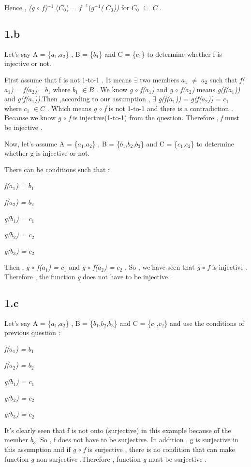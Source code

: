 \documentclass[12pt]{article}
\begin{document}
Hence , \textit{(g $\circ$ f)$^{-1}$} (\textit{$C_0$}) = \textit{$f^{-1}$}(\textit{$g^{-1}$(} \textit{$C_0$))} for \textit{$C_0$} $\subseteq$ \textit{$C$} .\\
\subsection*{1.b}
\hspace{15px} Let's say A = \{$a_1$,$a_2$\} , B = \{$b_1$\} and C = \{$c_1$\} to determine whether f is injective or not.\par
First assume that f is not 1-to-1 . It means $\exists$ two members $a_1$ $\neq$ $a_2$ such that \textit{f($a_1$) = f($a_2$)= $b_1$} where $b_1$ $\in{B}$ . We know \textit{g $\circ$ f($a_1$)} and \textit{g $\circ$ f($a_2$)} means \textit{g(f($a_1$))} and \textit{g(f($a_1$))}.Then ,according to our assumption , $\exists$ \textit{g(f($a_1$))} = \textit{g(f($a_2$))} = $c_1$ where $c_1$ $\in{C}$ . Which means \textit{g $\circ$ f} is not 1-to-1 and there is a contradiction . Because we know \textit{g $\circ$ f} is injective(1-to-1) from the question. Therefore , \textit{f} must be injective . \par 
Now, let's assume A = \{$a_1$,$a_2$\} , B = \{$b_1$,$b_2$,$b_3$\} and C = \{$c_1$,$c_2$\} to determine whether g is injective or not.\par
There can be conditions such that : \par
\textit{f($a_1$) = $b_1$} \par 
\textit{f($a_2$) = $b_2$} \par
\textit{g($b_1$) = $c_1$} \par 
\textit{g($b_2$) = $c_2$} \par
\textit{g($b_3$) = $c_2$} \par 
Then , \textit{g $\circ$ f($a_1$) = $c_1$} and \textit{g $\circ$ f($a_2$) = $c_2$} . So , we'have seen that \textit{g $\circ$ f} is injective . Therefore , the function \textit{g} does not have to be injective .

\subsection*{1.c}
\hspace{15px} Let's say A = \{$a_1$,$a_2$\} , B = \{$b_1$,$b_2$,$b_3$\} and C = \{$c_1$,$c_2$\} and use the conditions of previous question :\par
\textit{f($a_1$) = $b_1$} \par 
\textit{f($a_2$) = $b_2$} \par
\textit{g($b_1$) = $c_1$} \par 
\textit{g($b_2$) = $c_2$} \par
\textit{g($b_3$) = $c_2$} \par 
It's clearly seen that f is not onto (surjective) in this example because of the member $b_3$. So , f does not have to be surjective. In addition , g is surjective in this assumption and if \textit{g $\circ$ f} is surjective , there is no condition that can make function \textit{g} non-surjective .Therefore , function \textit{g} must be surjective . 
\end{document}
